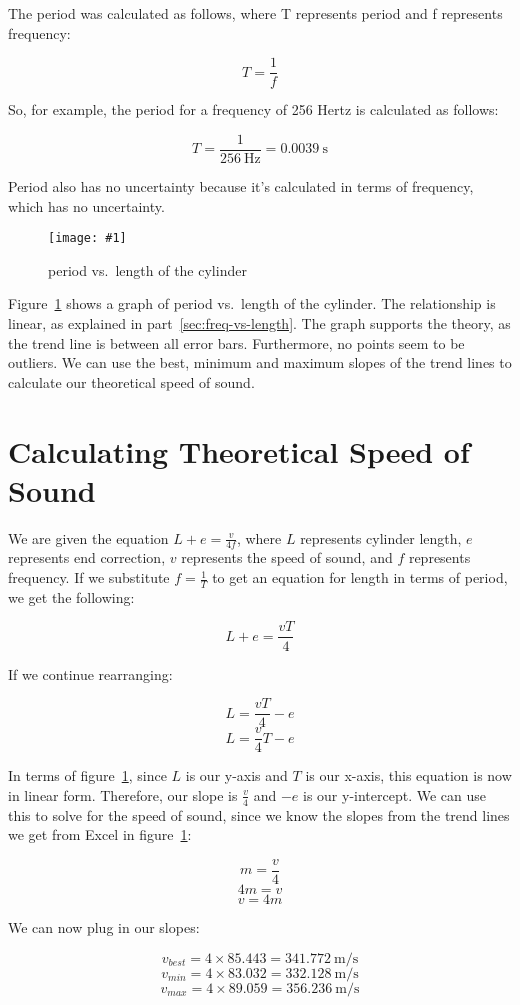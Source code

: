 \documentclass{report}
\newcommand{\graph}[2]{
  \begin{figure}[H]
    \medskip
    \centering
    \texttt{[image: \#1]}
    \caption{#2}
    \medskip\label{fig:#1}
  \end{figure}
}
\begin{document}
The period was calculated as follows, where T represents period and f
represents frequency:

\[T=\frac{1}{f}\]

So, for example, the period for a frequency of 256 Hertz is
calculated as follows:

\[T=\frac{1}{\SI{256}{\hertz}}=\SI{0.0039}{\second}\]

Period also has no uncertainty because it's calculated in terms of
frequency, which has no uncertainty.

\graph{period-vs-length}{period vs.\ length of the cylinder}

Figure~\ref{fig:period-vs-length} shows a graph of period vs.\ length
of the cylinder. The relationship is linear, as explained in
part~\ref{sec:freq-vs-length}. The graph supports the theory, as the
trend line is between all error bars. Furthermore, no points seem to
be outliers. We can use the best, minimum and maximum slopes of the
trend lines to calculate our theoretical speed of sound.

\section{Calculating Theoretical Speed of Sound}\label{sec:theoretical-speed}

We are given the equation \(L+e=\frac{v}{4f}\), where \(L\) represents cylinder
length, \(e\) represents end correction, \(v\) represents the speed of sound,
and \(f\) represents frequency. If we substitute \(f=\frac{1}{T}\) to get
an equation for length in terms of period, we get the following:

\[L+e=\frac{vT}{4}\]

If we continue rearranging:

\[L=\frac{vT}{4}-e\]
\[L=\frac{v}{4}T-e\]

In terms of figure~\ref{fig:period-vs-length}, since \(L\) is our
y-axis and \(T\) is our x-axis, this equation is now in linear form.
Therefore, our slope is \(\frac{v}{4}\) and \(-e\) is our
y-intercept. We can use this to solve for the speed of sound, since
we know the slopes from the trend lines we get from Excel in
figure~\ref{fig:period-vs-length}:

\[m=\frac{v}{4}\]
\[4m=v\]
\[v=4m\]

We can now plug in our slopes:

\[v_{best}=4\times85.443=\SI{341.772}{\metre\per\second}\]
\[v_{min}=4\times83.032=\SI{332.128}{\metre\per\second}\]
\[v_{max}=4\times89.059=\SI{356.236}{\metre\per\second}\]
\end{document}
